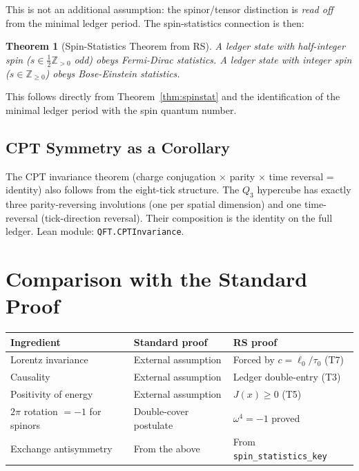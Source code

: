 \documentclass[12pt,a4paper]{article}
\newtheorem{theorem}{Theorem}[section]
\theoremstyle{definition}
\theoremstyle{remark}
\begin{document}
This is not an additional assumption: the spinor/tensor distinction is
\emph{read off} from the minimal ledger period.  The spin-statistics
connection is then:

\begin{theorem}[Spin-Statistics Theorem from RS]\label{thm:main}
A ledger state with half-integer spin ($s \in \frac{1}{2}\mathbb{Z}_{>0}$
odd) obeys Fermi-Dirac statistics.  A ledger state with integer spin
($s \in \mathbb{Z}_{\geq 0}$) obeys Bose-Einstein statistics.
\end{theorem}

This follows directly from Theorem~\ref{thm:spinstat} and the
identification of the minimal ledger period with the spin quantum number.

\subsection{CPT Symmetry as a Corollary}

The CPT invariance theorem (charge conjugation $\times$ parity $\times$
time reversal = identity) also follows from the eight-tick structure.
The $Q_3$ hypercube has exactly three parity-reversing involutions (one
per spatial dimension) and one time-reversal (tick-direction reversal).
Their composition is the identity on the full ledger.  Lean module:
\texttt{QFT.CPTInvariance}.

\section{Comparison with the Standard Proof}
\label{sec:comparison}

\begin{center}
\begin{tabular}{lll}
\toprule
Ingredient & Standard proof & RS proof \\
\midrule
Lorentz invariance & External assumption & Forced by $c = \ell_0/\tau_0$ (T7) \\
Causality & External assumption & Ledger double-entry (T3) \\
Positivity of energy & External assumption & $J(x) \geq 0$ (T5) \\
$2\pi$ rotation $= -1$ for spinors & Double-cover postulate & $\omega^4 = -1$ proved \\
Exchange antisymmetry & From the above & From \texttt{spin\_statistics\_key} \\
\bottomrule
\end{tabular}
\end{center}
\end{document}
